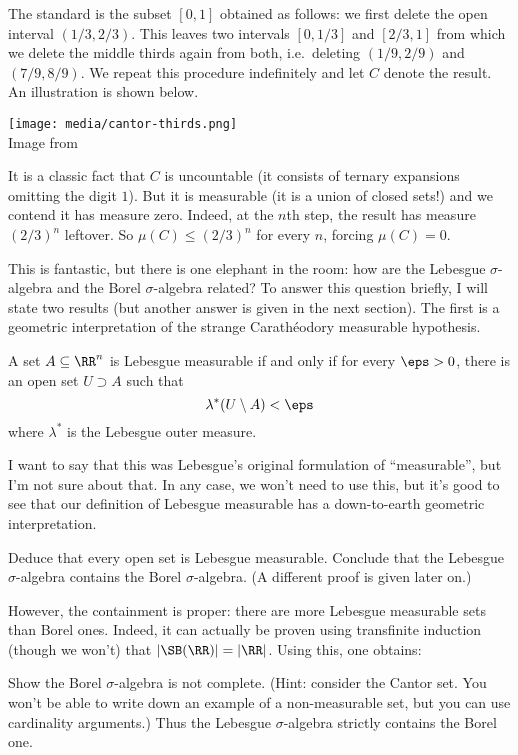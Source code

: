 \begin{example}
	The standard  is the subset
	$[0,1]$ obtained as follows:
	we first delete the open interval $(1/3, 2/3)$.
	This leaves two intervals $[0,1/3]$ and $[2/3,1]$
	from which we delete the middle thirds again from both,
	i.e.\ deleting $(1/9,2/9)$ and $(7/9,8/9)$.
	We repeat this procedure indefinitely and let $C$ denote the result.
	An illustration is shown below.
	\begin{center}
		\texttt{[image: media/cantor-thirds.png]} \\
		\footnotesize Image from \cite{img:cantor}
	\end{center}
	It is a classic fact that $C$ is uncountable
	(it consists of ternary expansions omitting the digit $1$).
	But it is measurable (it is a union of closed sets!)
	and we contend it has measure zero.
	Indeed, at the $n$th step, the result has measure $(2/3)^n$ leftover.
	So $\mu(C) \le (2/3)^n$ for every $n$, forcing $\mu(C) = 0$.
\end{example}

This is fantastic, but there is one elephant in the room:
how are the Lebesgue $\sigma$-algebra and the Borel $\sigma$-algebra related?
To answer this question briefly, I will state two results
(but another answer is given in the next section).
The first is a geometric interpretation of the strange
Carath\'{e}odory measurable hypothesis.
\begin{proposition}
	\label{prop:lebesgue_geo}
	A set $A \subseteq \RR^n$ is Lebesgue measurable
	if and only if for every $\eps > 0$,
	there is an open set $U \supset A$ such that
	\[ \lambda^\ast(U \setminus A) < \eps \]
	where $\lambda^\ast$ is the Lebesgue outer measure.
\end{proposition}
I want to say that this was Lebesgue's original formulation
of ``measurable'', but I'm not sure about that.
In any case, we won't need to use this,
but it's good to see that our definition of Lebesgue measurable
has a down-to-earth geometric interpretation.

\begin{ques}
	Deduce that every open set is Lebesgue measurable.
	Conclude that the Lebesgue $\sigma$-algebra
	contains the Borel $\sigma$-algebra.
	(A different proof is given later on.)
\end{ques}

However, the containment is proper:
there are more Lebesgue measurable sets than Borel ones.
Indeed, it can actually be proven using transfinite induction
(though we won't) that
$\left\lvert \SB(\RR) \right\rvert = \left\lvert \RR \right\rvert$.
Using this, one obtains:
\begin{exercise}
	Show the Borel $\sigma$-algebra is not complete.
	(Hint: consider the Cantor set.
	You won't be able to write down an example of a non-measurable
	set, but you can use cardinality arguments.)
	Thus the Lebesgue $\sigma$-algebra strictly contains the Borel one.
\end{exercise}

